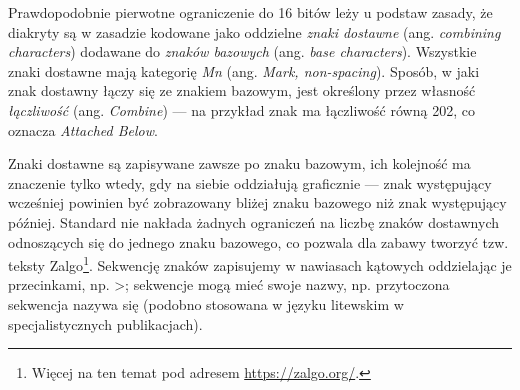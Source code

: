 Prawdopodobnie pierwotne ograniczenie do 16 bitów leży u podstaw
zasady, że diakryty są w zasadzie kodowane jako oddzielne
\textit{znaki dostawne} (ang. \textit{combining characters}) dodawane
do \textit{znaków bazowych} (ang. \textit{base characters}). Wszystkie
znaki dostawne mają kategorię \textit{Mn} (ang. \textit{Mark,
  non-spacing}). Sposób, w jaki znak dostawny łączy się ze znakiem
bazowym, jest określony przez własność \textit{łączliwość}
(ang. \textit{Combine}) --- na przykład znak  %
ma łączliwość równą 202, co oznacza \textit{Attached Below}.

Znaki dostawne są zapisywane zawsze po znaku bazowym, ich kolejność ma
znaczenie tylko wtedy, gdy na siebie oddziałują graficznie --- znak
występujący wcześniej powinien być zobrazowany bliżej znaku bazowego
niż znak występujący później. Standard nie nakłada żadnych ograniczeń
na liczbę znaków dostawnych odnoszących się do jednego znaku bazowego,
co pozwala dla zabawy tworzyć tzw. teksty Zalgo\footnote{Więcej na ten
  temat pod adresem \url{https://zalgo.org/}.}. Sekwencję znaków
zapisujemy w nawiasach kątowych oddzielając je przecinkami,
np. >; sekwencje mogą mieć swoje nazwy,
np. przytoczona sekwencja nazywa się  (podobno stosowana w języku
litewskim w specjalistycznych publikacjach).









